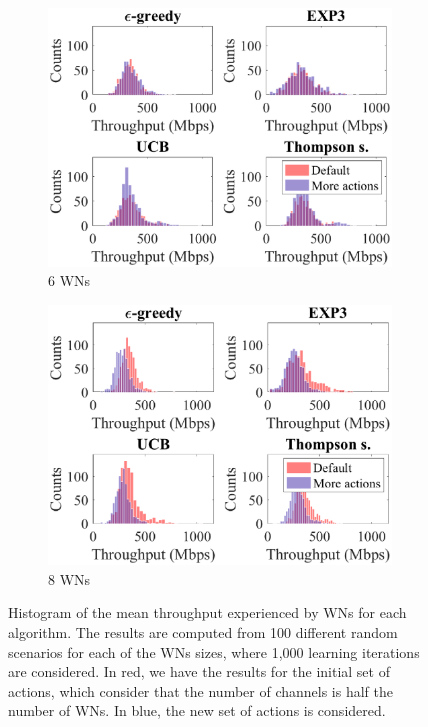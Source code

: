 \documentclass[preprint,12pt]{article}
\begin{document}
\begin{figure}[h!]
\begin{subfigure}[b]{.4\textwidth}
		\includegraphics[width=\textwidth]{images/hist_mean_tpt_6_WNs_actions}
		\caption{6 WNs}\label{fig:hist_mean_tpt_6_WNs_actions}
	\end{subfigure}
	\begin{subfigure}[b]{.4\textwidth}
		\includegraphics[width=\textwidth]{images/hist_mean_tpt_8_WNs_actions}
		\caption{8 WNs}\label{fig:hist_mean_tpt_8_WNs_actions}
	\end{subfigure}
	\caption{Histogram of the mean throughput experienced by WNs for each algorithm. The results are computed from 100 different random scenarios for each of the WNs sizes, where 1,000 learning iterations are considered. In red, we have the results for the initial set of actions, which consider that the number of channels is half the number of WNs. In blue, the new set of actions is considered.}
	\label{fig:scalability_more_actions}
\end{figure}
\end{document}
